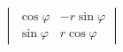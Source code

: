 \documentclass[preview]{standalone}
\begin{document}
\begin{align*}
\begin{vmatrix}\cos \varphi & -r \sin \varphi \\\sin \varphi & r \cos \varphi\end{vmatrix}
\end{align*}
\end{document}
